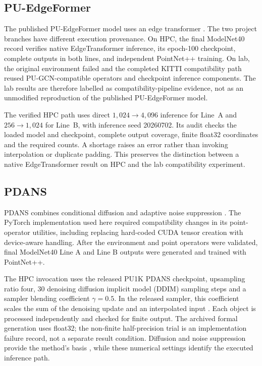 \subsection{PU-EdgeFormer}\label{sec:fc-4-5-6}
The published PU-EdgeFormer model uses an edge transformer \cite{kim2023puedgeformer}. The two project branches have different execution provenance. On HPC, the final
ModelNet40 record verifies native EdgeTransformer inference, its epoch-100
checkpoint, complete outputs in both lines, and independent PointNet++
training. On lab, the original environment failed
and the completed KITTI compatibility path reused PU-GCN-compatible
operators and checkpoint inference components.
The lab results are therefore labelled as compatibility-pipeline evidence,
not as an unmodified reproduction of the published PU-EdgeFormer model.

The verified HPC path uses direct $1,024\rightarrow4,096$ inference
for Line~A and $256\rightarrow1,024$ for Line~B, with inference seed
20260702. Its audit checks the loaded model and checkpoint, complete
output coverage, finite float32 coordinates and the required counts.
A shortage raises an error rather than invoking interpolation or
duplicate padding. This preserves the distinction between a native
EdgeTransformer result on HPC and the lab compatibility experiment.

\subsection{PDANS}
\label{sec:fc-4-5-7}

PDANS combines conditional diffusion and adaptive noise suppression \cite{zhang2025pdans}. The PyTorch implementation used here required compatibility changes in its point-operator utilities, including replacing hard-coded CUDA tensor creation with device-aware handling. After the environment and point operators were validated, final ModelNet40 Line A and Line B outputs were generated and trained with PointNet++.

The HPC invocation uses the released PU1K PDANS checkpoint,
upsampling ratio four, 30 denoising diffusion implicit model (DDIM) sampling steps and a sampler
blending coefficient $\gamma=0.5$. In the released sampler, this
coefficient scales the sum of the denoising update and an
interpolated input \cite{zhang2025pdans}. Each object is processed independently
and checked for finite output. The archived formal generation uses
float32; the non-finite half-precision trial is an implementation
failure record, not a separate result condition. Diffusion and noise
suppression provide the method's basis \cite{zhang2025pdans}, while
these numerical settings identify the executed inference path.

